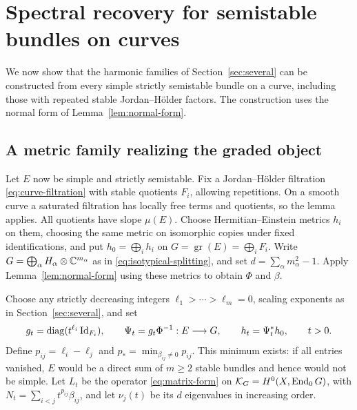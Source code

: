 \section{Spectral recovery for semistable bundles on curves}\label{sec:curve-recovery}

We now show that the harmonic families of Section~\ref{sec:several} can be
constructed from every simple strictly semistable bundle on a curve,
including those with repeated stable Jordan--H\"older factors. The
construction uses the normal form of Lemma~\ref{lem:normal-form}.

\subsection{A metric family realizing the graded object}

Let $E$ now be simple and strictly semistable. Fix a Jordan--H\"older
filtration \eqref{eq:curve-filtration} with stable quotients $F_i$,
allowing repetitions. On a smooth curve a saturated
filtration has locally free terms and quotients, so the lemma applies.
All quotients have slope $\mu(E)$. Choose Hermitian--Einstein metrics
$h_i$ on them, choosing the same metric on isomorphic copies under
fixed identifications, and put $h_0=\bigoplus_i h_i$ on
$G=\operatorname{gr}(E)=\bigoplus_iF_i$.
Write $G=\bigoplus_\alpha H_\alpha\otimes\mathbb C^{m_\alpha}$ as in
\eqref{eq:isotypical-splitting}, and set
$d=\sum_\alpha m_\alpha^2-1$.
Apply Lemma~\ref{lem:normal-form} using these metrics to obtain
$\Phi$ and $\beta$.

Choose any strictly decreasing integers $\ell_1>\cdots>\ell_m=0$, scaling
exponents as in Section~\ref{sec:several}, and set
\begin{equation}\label{eq:recovery-gauges}
 g_t=\operatorname{diag}(t^{\ell_i}\operatorname{Id}_{F_i}),\qquad
 \Psi_t=g_t\Phi^{-1}:E\longrightarrow G,\qquad
 h_t=\Psi_t^*h_0,\qquad t>0.
\end{equation}
Define $p_{ij}=\ell_i-\ell_j$ and
$p_* =\min_{\beta_{ij}\ne0}p_{ij}$. This minimum exists: if all
entries vanished, $E$ would be a direct sum of $m\ge2$ stable
bundles and hence would not be simple. Let $L_t$ be the operator
\eqref{eq:matrix-form} on $\mathcal K_G=H^0(X,\operatorname{End}_0G)$, with
$N_t=\sum_{i<j}t^{p_{ij}}\beta_{ij}$, and let $\nu_j(t)$ be its
$d$ eigenvalues in increasing order.

